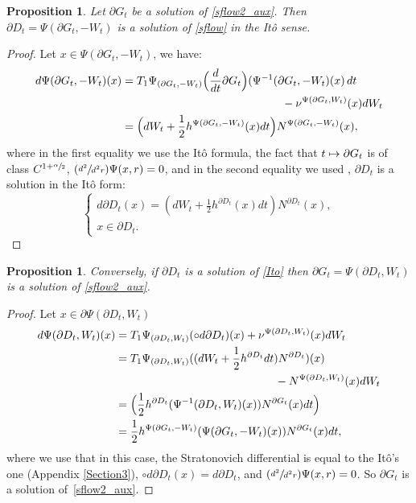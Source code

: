 \documentclass[JEP,XML,SOM,Unicode,NoFloatCountersInSection,published]{cedram}
\newcommand\mto{\mathchoice{\longmapsto}{\mapsto}{\mapsto}{\mapsto}}
\newcommand{\Psfrac}[2]{(\sfrac{#1}{#2})}
\theoremstyle{plain}
\newtheorem{prop}[thm]{Proposition}
\theoremstyle{definition}
\newcommand{\bqn}[1]{\begin{equation}\label{#1}}
\newcommand{\eqn}{\end{equation}}
\let\f\frac
\begin{document}
\begin{prop}
Let $ \partial{G}_t$ be a solution of \eqref{sflow2_aux}. Then $\partial D_t = \Psi( \partial G _ t, -W_t)$ is a solution of \eqref{sflow} in the Itô sense.
\end{prop}
\begin{proof}
Let $ x \in \Psi( \partial G _ t, -W_t)$, we have:
\begin{equation}
\begin{split}
d \Psi( \partial G _ t, -W_t) (x)
& = T_1\Psi_{( \partial G _ t, -W_t)} \Bigl(\frac{d}{dt} \partial G_t\Bigr) (\Psi^{-1}(\partial G_ t,-W_t )(x) \,d t \\
&\hspace*{5cm}- \nu^{\Psi( \partial G _ t, \-W_t)}(x) dW_t \\
& =\Bigl(dW_t+\f12h^{\Psi( \partial G _ t, -W_t)}(x)dt\Bigr)N^{\Psi( \partial G _ t, -W_t)}(x),
\end{split}
\end{equation}
where in the first equality we use the Itô formula, the fact that $ t \mto \partial G_t $ is of class $C^{1 + \sfrac{\alpha}{2}} $, $\Psfrac{d^2}{d^2r} \Psi(x,r) = 0$, and in the second equality we used \cite[Lem.\,13]{zbMATH07470497}, \ie $\partial D_t$ is a solution in
the Itô form:
\bqn{Ito}
\begin{cases}
d \partial D_t (x) = (dW_t+\f12h^{\partial D_t}(x)dt)N^{\partial D_t}(x),\\
x \in \partial D_t.
\end{cases}
\eqn

\end{proof}
\begin{prop}
Conversely, if $\partial D_t $ is a solution of \eqref{Ito} then $\partial G _ t = \Psi (\partial D_t, W_t) $ is a solution of \eqref{sflow2_aux}.
\end{prop}

\begin{proof}
Let $x \in \partial \Psi (\partial D_t, W_t) $
\begin{equation}
\begin{split}
d \Psi( \partial D _ t, W_t) (x)
&= T_1\Psi_{( \partial D _ t, W_t)} (\circ d \partial D_t) (x) +\nu^{\Psi( \partial D _ t, W_t)}(x) dW_t \\
&= T_1\Psi_{( \partial D _ t, W_t)} ( (dW_t+\f12h^{\partial D_t}dt)N^{\partial D_t}) (x) \\
&\hspace*{5cm}-N^{\Psi( \partial D _ t,W_t)}(x) dW_t \\
&= \Bigl(\f12h^{\partial D_t}( \Psi^{-1}( \partial D_t, W_t)(x) )N^{\partial G_t}(x) dt\Bigr) \\
&=\f12h^{\Psi( \partial G_t, -W_t)}( \Psi( \partial G_t, -W_t)(x) )N^{\partial G_t}(x) dt,
\end{split}
\end{equation}
where we use that in this case, the Stratonovich differential is equal to the Itô's one (\cf Appendix \ref{Section3}), \ie $\circ d \partial D_t(x) = d \partial D_t $, and $\Psfrac{d^2}{d^2r} \Psi(x,r) = 0$.
So $\partial G _t$ is a solution of~\eqref{sflow2_aux}.
\end{proof}
\end{document}
